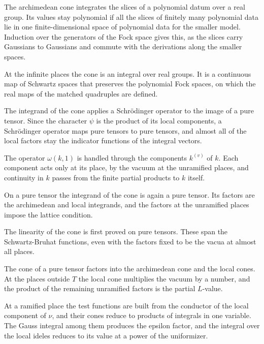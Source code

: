 The archimedean cone integrates the slices of a polynomial datum over a real
group. Its values stay polynomial if all the slices of finitely many polynomial
data lie in one finite-dimensional space of polynomial data for the smaller
model. Induction over the generators of the Fock space gives this, as the slices
carry Gaussians to Gaussians and commute with the derivations along the smaller
spaces.

At the infinite places the cone is an integral over real groups. It is a
continuous map of Schwartz spaces that preserves the polynomial Fock spaces, on
which the real maps of the matched quadruples are defined.

The integrand of the cone applies a Schrödinger operator to the image of a pure
tensor. Since the character $\psi$ is the product of its local components, a
Schrödinger operator maps pure tensors to pure tensors, and almost all of the
local factors stay the indicator functions of the integral vectors.

The operator $\omega(k,1)$ is handled through the components $k^{(v)}$ of $k$.
Each component acts only at its place, by the vacuum at the unramified places,
and continuity in $k$ passes from the finite partial products to $k$ itself.

On a pure tensor the integrand of the cone is again a pure tensor. Its factors
are the archimedean and local integrands, and the factors at the unramified
places impose the lattice condition.

The linearity of the cone is first proved on pure tensors. These span the
Schwartz-Bruhat functions, even with the factors fixed to be the vacua at almost
all places.

The cone of a pure tensor factors into the archimedean cone and the local
cones. At the places outside $T$ the local cone multiplies the vacuum by a
number, and the product of the remaining unramified factors is the partial
$L$-value.

At a ramified place the test functions are built from the conductor of the
local component of $\nu$, and their cones reduce to products of integrals in one
variable. The Gauss integral among them produces the epsilon factor, and the
integral over the local ideles reduces to its value at a power of the
uniformizer.

